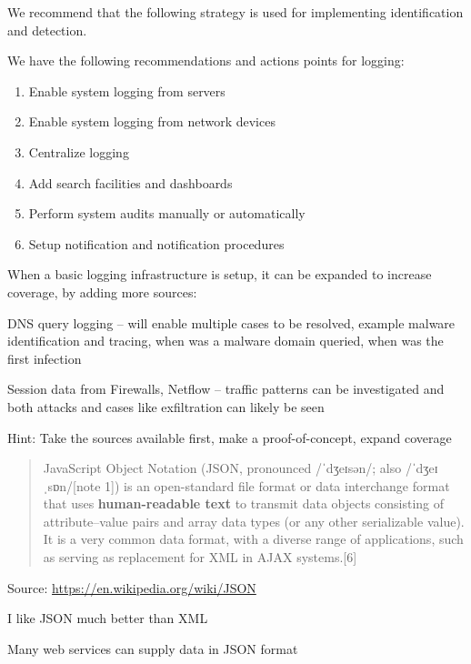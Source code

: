 \documentclass[Screen16to9,17pt]{foils}
\begin{document}
We recommend that the following strategy is used for implementing identification and detection.

We have the following recommendations and actions points for logging:
\begin{enumerate}
\item[\faSquareO] Enable system logging from servers
\item[\faSquareO] Enable system logging from network devices
\item[\faSquareO] Centralize logging
\item[\faSquareO] Add search facilities and dashboards
\item[\faSquareO] Perform system audits manually or automatically
\item[\faSquareO] Setup notification and notification procedures
\end{enumerate}

When a basic logging infrastructure is setup, it can be expanded to increase coverage, by
adding more sources:

\begin{list2}
\item DNS query logging -- will enable multiple cases to be resolved, example malware identification and tracing, when was a malware domain queried, when was the first infection
\item Session data from Firewalls, Netflow -- traffic patterns can be investigated and both attacks and cases like exfiltration can likely be seen
\end{list2}

Hint: Take the sources available first, make a proof-of-concept, expand coverage



\begin{quote}
JavaScript Object Notation (JSON, pronounced /ˈdʒeɪsən/; also /ˈdʒeɪˌsɒn/[note 1]) is an open-standard file format or data interchange format that uses {\bf human-readable text} to transmit data objects consisting of attribute–value pairs and array data types (or any other serializable value). It is a very common data format, with a diverse range of applications, such as serving as replacement for XML in AJAX systems.[6]
\end{quote}
Source: \url{https://en.wikipedia.org/wiki/JSON}

\begin{list2}
\item I like JSON much better than XML
\item Many web services can supply data in JSON format
\end{list2}
\end{document}
